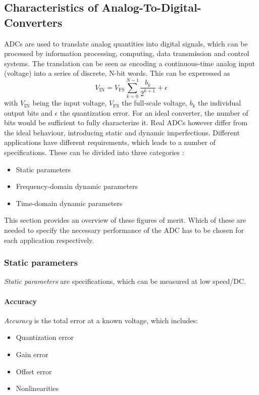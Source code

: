 \subsection{Characteristics of Analog-To-Digital-Converters}
ADCs are used to translate analog quantities into digital signals, which can be processed by information processing, computing, data transmission and control systems. The translation can be seen as encoding a continuous-time analog input (voltage) into a series of discrete, N-bit words. This can be experessed as
\begin{equation}
	V_{\text{IN}} = V_{\text{FS}} \sum_{k = 0}^{N-1} \frac{b_k}{2^{k+1}} + \epsilon
\end{equation}
with $V_{\text{IN}}$ being the input voltage, $V_{\text{FS}}$ the full-scale voltage, $b_k$ the individual output bits and $\epsilon$ the quantization error. 
For an ideal converter, the number of bits would be sufficient to fully characterize it. Real ADCs however differ from the ideal behaviour, introducing static and dynamic imperfections. Different applications have different requirements, which leads to a number of specifications. These can be divided into three categories \cite{Lundberg}:
\begin{itemize}
	\item Static parameters
	\item Frequency-domain dynamic parameters
	\item Time-domain dynamic parameters
\end{itemize}
This section provides an overview of these figures of merit. Which of these are needed to specify the necessary performance of the ADC has to be chosen for each application respectively.

\subsubsection*{Static parameters}
\textit{Static parameters} are specifications, which can be measured at low speed/DC. 
\paragraph{Accuracy}
\textit{Accuracy} is the total error at a known voltage, which includes:
\begin{itemize}
	\item Quantization error
	\item Gain error
	\item Offset error
	\item Nonlinearities
\end{itemize}

